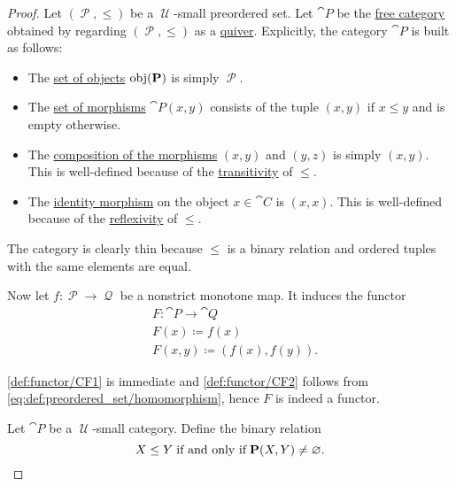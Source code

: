 \begin{proof}
   Let \( (\mscrP, \leq) \) be a \( \mscrU \)-small preordered set. Let \( \cat{P} \) be the \hyperref[def:quiver_free_category]{free category} obtained by regarding \( (\mscrP, \leq) \) as a \hyperref[def:quiver]{quiver}. Explicitly, the category \( \cat{P} \) is built as follows:
  \begin{itemize}
    \item The \hyperref[def:category/objects]{set of objects} \( \operatorname{obj}(\operatorname{\mathbf{P}}) \) is simply \( \mscrP \).

    \item The \hyperref[def:category/morphisms]{set of morphisms} \( \cat{P}(x, y) \) consists of the tuple \( (x, y) \) if \( x \leq y \) and is empty otherwise.

    \item The \hyperref[def:category/composition]{composition of the morphisms} \( (x, y) \) and \( (y, z) \) is simply \( (x, y) \). This is well-defined because of the \hyperref[def:binary_relation/transitive]{transitivity} of \( \leq \).

    \item The \hyperref[def:category/identity]{identity morphism} on the object \( x \in \cat{C} \) is \( (x, x) \). This is well-defined because of the \hyperref[def:binary_relation/reflexive]{reflexivity} of \( \leq \).
  \end{itemize}

  The category is clearly thin because \( \leq \) is a binary relation and ordered tuples with the same elements are equal.

  Now let \( f: \mscrP \to \mscrQ \) be a nonstrict monotone map. It induces the functor
  \begin{equation*}
    \begin{aligned}
      &F: \cat{P} \to \cat{Q} \\
      &F(x) \coloneqq f(x) \\
      &F(x, y) \coloneqq (f(x), f(y)).
    \end{aligned}
  \end{equation*}

  \ref{def:functor/CF1} is immediate and \ref{def:functor/CF2} follows from \eqref{eq:def:preordered_set/homomorphism}, hence \( F \) is indeed a functor.

   Let \( \cat{P} \) be a \( \mscrU \)-small category. Define the binary relation
  \begin{equation*}
    X \leq Y \T{if and only if} \cat{P}(X, Y) \neq \varnothing.
  \end{equation*}


\end{proof}
